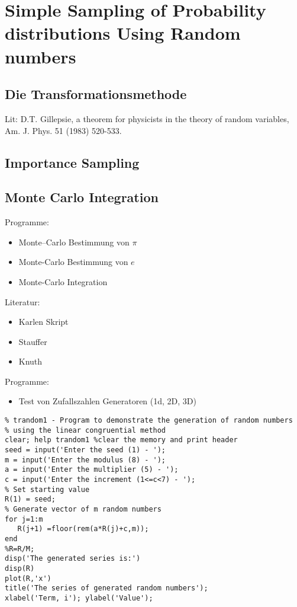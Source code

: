 \chapter{Simple Sampling of Probability distributions Using Random numbers}


\section{Die Transformationsmethode}
Lit: D.T. Gillepsie, a theorem for physicists in the theory of 
random variables, Am. J. Phys. 51 (1983) 520-533.

\section{Importance Sampling}

\section{Monte Carlo Integration}


Programme:
\begin{itemize}
\item Monte--Carlo Bestimmung von $\pi$
\item Monte-Carlo Bestimmung von $e$
\item Monte-Carlo Integration
\end{itemize}

Literatur:
\begin{itemize}
\item Karlen Skript
\item Stauffer
\item Knuth
\end{itemize}

Programme:
\begin{itemize}
\item Test von Zufallszahlen Generatoren (1d, 2D, 3D)
\end{itemize}


\begin{verbatim}
% trandom1 - Program to demonstrate the generation of random numbers
% using the linear congruential method
clear; help trandom1 %clear the memory and print header
seed = input('Enter the seed (1) - ');
m = input('Enter the modulus (8) - ');
a = input('Enter the multiplier (5) - ');
c = input('Enter the increment (1<=c<7) - ');
% Set starting value
R(1) = seed;
% Generate vector of m random numbers
for j=1:m
   R(j+1) =floor(rem(a*R(j)+c,m));
end
%R=R/M;
disp('The generated series is:')
disp(R)
plot(R,'x')
title('The series of generated random numbers');
xlabel('Term, i'); ylabel('Value');
\end{verbatim}

